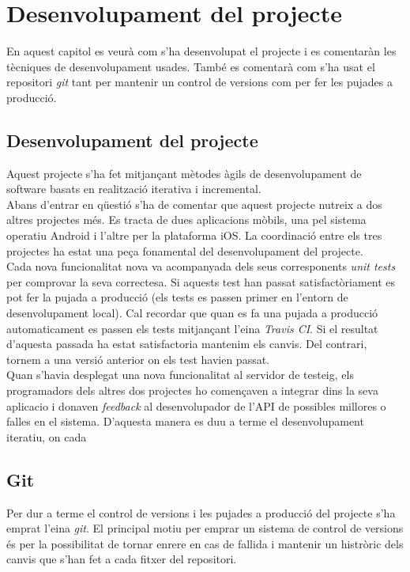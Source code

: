 \chapter{Desenvolupament del projecte}\label{desenvolupament}

En aquest capitol es veurà com s'ha desenvolupat el projecte i es comentaràn les tècniques de desenvolupament usades. També es comentarà com s'ha usat el repositori \emph{git} tant per mantenir un control de versions com per fer les pujades a producció.

\section{Desenvolupament del projecte}
Aquest projecte s'ha fet mitjançant mètodes àgils de desenvolupament de software basats en realització iterativa i incremental.\\

Abans d'entrar en qüestió s'ha de comentar que aquest projecte nutreix a dos altres projectes més. Es tracta de dues aplicacions mòbils, una pel sistema operatiu Android i l'altre per la plataforma iOS. La coordinació entre els tres projectes ha estat una peça fonamental del desenvolupament del projecte.\\

Cada nova funcionalitat nova va acompanyada dels seus corresponents \emph{unit tests} per comprovar la seva correctesa. Si aquests test han passat satisfactòriament es pot fer la pujada a producció (els tests es passen primer en l'entorn de desenvolupament local). Cal recordar que quan es fa una pujada a producció automaticament es passen els tests mitjançant l'eina \emph{Travis CI}. Si el resultat d'aquesta passada ha estat satisfactoria mantenim els canvis. Del contrari, tornem a una versió anterior on els test havien passat.\\

Quan s'havia desplegat una nova funcionalitat al servidor de testeig, els programadors dels altres dos projectes ho començaven a integrar dins la seva aplicacio i donaven \emph{feedback} al desenvolupador de l'\ac{API} de possibles millores o falles en el sistema. D'aquesta manera es duu a terme el desenvolupament iteratiu, on cada

\section{Git}

Per dur a terme el control de versions i les pujades a producció del projecte s'ha emprat l'eina \emph{git}. El principal motiu per emprar un sistema de control de versions és per la possibilitat de tornar enrere en cas de fallida i mantenir un histròric dels canvis que s'han fet a cada fitxer del repositori.\\

